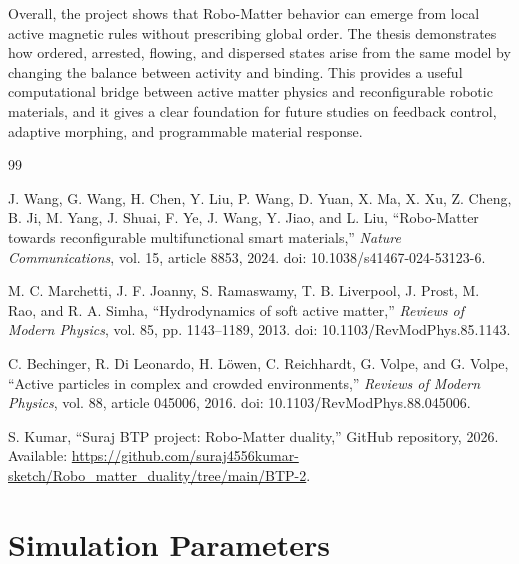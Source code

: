 \documentclass[12pt,a4paper,oneside]{report}
\begin{document}
Overall, the project shows that Robo-Matter behavior can emerge from local active magnetic rules without prescribing global order. The thesis demonstrates how ordered, arrested, flowing, and dispersed states arise from the same model by changing the balance between activity and binding. This provides a useful computational bridge between active matter physics and reconfigurable robotic materials, and it gives a clear foundation for future studies on feedback control, adaptive morphing, and programmable material response.

\begin{thebibliography}{99}

J. Wang, G. Wang, H. Chen, Y. Liu, P. Wang, D. Yuan, X. Ma, X. Xu, Z. Cheng, B. Ji, M. Yang, J. Shuai, F. Ye, J. Wang, Y. Jiao, and L. Liu, ``Robo-Matter towards reconfigurable multifunctional smart materials,'' \textit{Nature Communications}, vol. 15, article 8853, 2024. doi: 10.1038/s41467-024-53123-6.

M. C. Marchetti, J. F. Joanny, S. Ramaswamy, T. B. Liverpool, J. Prost, M. Rao, and R. A. Simha, ``Hydrodynamics of soft active matter,'' \textit{Reviews of Modern Physics}, vol. 85, pp. 1143--1189, 2013. doi: 10.1103/RevModPhys.85.1143.

C. Bechinger, R. Di Leonardo, H. L\"owen, C. Reichhardt, G. Volpe, and G. Volpe, ``Active particles in complex and crowded environments,'' \textit{Reviews of Modern Physics}, vol. 88, article 045006, 2016. doi: 10.1103/RevModPhys.88.045006.

S. Kumar, ``Suraj BTP project: Robo-Matter duality,'' GitHub repository, 2026. Available: \url{https://github.com/suraj4556kumar-sketch/Robo_matter_duality/tree/main/BTP-2}.

\end{thebibliography}

\appendix

\chapter{Simulation Parameters}
\end{document}
